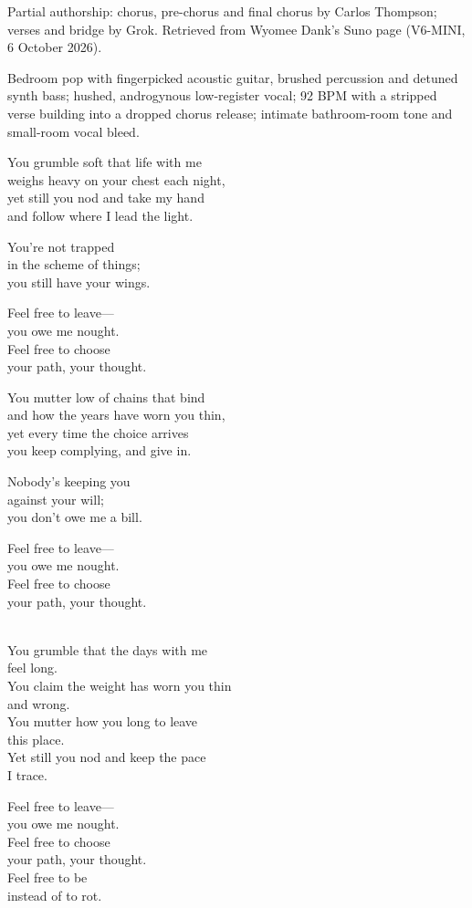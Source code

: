 
\label{sec:you-owe-me-nought}
\begin{notes}
Partial authorship: chorus, pre-chorus and final chorus by Carlos Thompson; verses and bridge by Grok. Retrieved from Wyomee Dank's Suno page (V6-MINI, 6 October 2026).
\end{notes}
\begin{style}
Bedroom pop with fingerpicked acoustic guitar, brushed percussion and detuned synth bass; hushed, androgynous low-register vocal; 92 BPM with a stripped verse building into a dropped chorus release; intimate bathroom-room tone and small-room vocal bleed.
\end{style}
\begin{lyrics}
You grumble soft that life with me\\
weighs heavy on your chest each night,\\
yet still you nod and take my hand\\
and follow where I lead the light.

You're not trapped\\
in the scheme of things;\\
you still have your wings.

Feel free to leave—\\
you owe me nought.\\
Feel free to choose\\
your path, your thought.

You mutter low of chains that bind\\
and how the years have worn you thin,\\
yet every time the choice arrives\\
you keep complying, and give in.

Nobody's keeping you\\
against your will;\\
you don't owe me a bill.

Feel free to leave—\\
you owe me nought.\\
Feel free to choose\\
your path, your thought.

\\
You grumble that the days with me\\
feel long.\\
You claim the weight has worn you thin\\
and wrong.\\
You mutter how you long to leave\\
this place.\\
Yet still you nod and keep the pace\\
I trace.

Feel free to leave—\\
you owe me nought.\\
Feel free to choose\\
your path, your thought.\\
Feel free to be\\
instead of to rot.
\end{lyrics}

